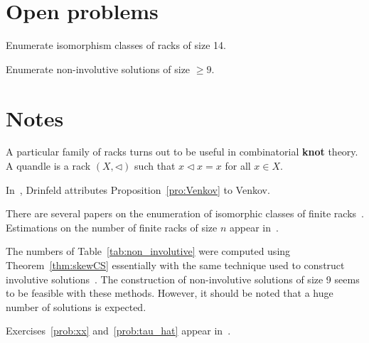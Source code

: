 \section*{Open problems}

\begin{problem}
\label{problem:racks14}
Enumerate isomorphism classes of racks of size 14. 
\end{problem}

\begin{problem}
Enumerate non-involutive solutions of size $\geq9$. 
\end{problem}


\section*{Notes}

A particular family of racks turns out to be useful in combinatorial {\bf knot} theory. A quandle
is a rack $(X,\triangleleft)$ such that $x\triangleleft x=x$ for all $x\in X$. 

In~\cite{MR1183474}, Drinfeld attributes Proposition~\ref{pro:Venkov} to Venkov. 

There are several papers on the enumeration of isomorphic classes of finite racks~\cite{MR3665565,MR3118951,MR3904151}. 
Estimations on the number of finite
racks of size $n$ appear in~\cite{MR3118951}. 

The numbers of Table~\ref{tab:non_involutive} were computed using 
Theorem~\ref{thm:skewCS} essentially with the same technique used to construct involutive solutions~\cite{AMV}. 
The construction of non-involutive solutions of size 9 seems to be feasible with these methods. 
However, it should be noted that a huge number of solutions is expected. 

Exercises~\ref{prob:xx} and~\ref{prob:tau_hat} appear in~\cite{MR3974961}. 

